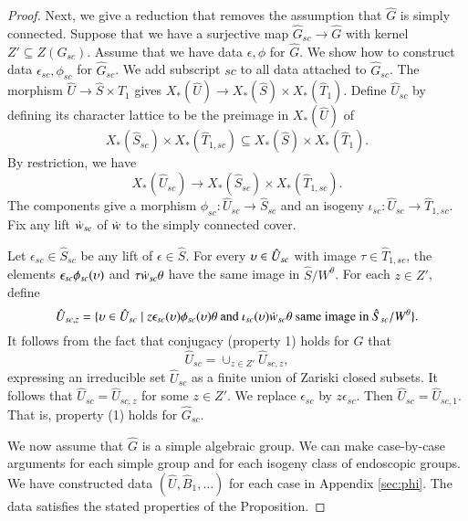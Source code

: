 \begin{proof}
  Next, we give a reduction that removes the assumption that $\hat G$
  is simply connected.  Suppose that we have a surjective map $\hat
  G_{sc}\to \hat G$ with kernel $Z' \subseteq Z(G_{sc})$.  Assume that
  we have data $\epsilon,\phi$ for $\hat G$.  We show how to construct
  data $\epsilon_{sc},\phi_{sc}$ for $\hat G_{sc}$.  We add subscript
  ${sc}$ to all data attached to $\hat G_{sc}$.  The morphism $\hat U
  \to \hat S\times \hat T_1$ gives $X_*(\hat U)\to X_*(\hat S)\times
  X_*(\hat T_1)$.  Define $\hat U_{sc}$ by defining its character
  lattice to be the preimage in $X_*(\hat U)$ of
\[
X_*(\hat S_{sc})\times X_*(\hat T_{1, sc}) 
\subseteq X_*(\hat S)\times X_*(\hat T_1).
\] 
By restriction, we have
\[
X_*(\hat U_{sc})\to X_*(\hat S_{sc}) \times X_*(\hat T_{1,sc}).  
\]
The components give a morphism $\phi_{sc}:\hat U_{sc}\to\hat S_{sc}$
and an isogeny $\iota_{sc}:\hat U_{sc} \to \hat T_{1,sc}$.  Fix any
lift $\dot w_{sc}$ of $\dot w$ to the simply connected cover.

Let $\epsilon_{sc}\in \hat S_{sc}$ be any lift of
$\epsilon\in \hat S$.  For every $\upsilon\in \hat U_{sc}$ with image
$\tau\in \hat T_{1,sc}$, the elements $\epsilon_{sc}\phi_{sc}(\upsilon)$
and $\tau\dot w_{sc}\theta$ have the same image in $\hat S/W^\theta$.
For each $z\in Z'$, define
\[
\hat U_{sc,z} = \{\upsilon \in \hat U_{sc}\mid 
z \epsilon_{sc}(\upsilon)\phi_{sc}(\upsilon)\theta\text{ and }
\iota_{sc}(\upsilon)\dot w_{sc}\theta \text{ same image in } \hat S_{sc}/W^\theta\}.
\]
 It follows from
the fact that conjugacy (property 1) holds for $\hat G$ that
\[
\hat U_{sc} = \cup_{z\in Z'} \hat U_{sc,z},
\]
expressing an irreducible set $\hat U_{sc}$ as a finite union of
Zariski closed subsets.  It follows that $\hat U_{sc} = \hat U_{sc,z}$ for
some $z\in Z'$.  We replace $\epsilon_{sc}$ by $z\epsilon_{sc}$.  Then
$\hat U_{sc} = \hat U_{sc,1}$.  That is, property (1) holds for
$\hat G_{sc}$.




We now assume that $\hat G$ is a simple algebraic group.  We can make
case-by-case arguments for each simple group and for each isogeny class of
endoscopic groups.  We have constructed data $(\hat U,\hat
B_1,\ldots)$ for each
case in Appendix \ref{sec:phi}.  The data satisfies the stated
properties
of the Proposition.
\end{proof}


